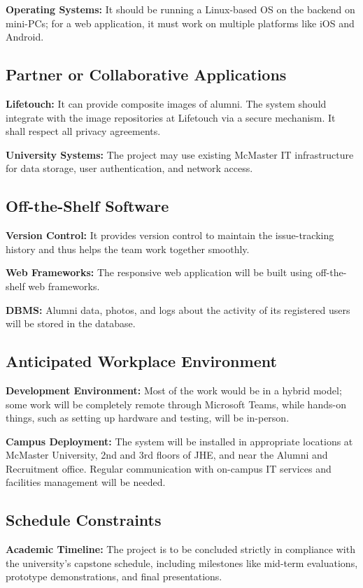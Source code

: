 \documentclass[12pt]{article}
\begin{document}
\textbf{Operating Systems:} It should be running a Linux-based OS on the backend on mini-PCs; for a web application, it must work on multiple platforms like iOS and Android.

\subsection{Partner or Collaborative Applications}
\textbf{Lifetouch:} It can provide composite images of alumni. The system should integrate with the image repositories at Lifetouch via a secure mechanism. It shall respect all privacy agreements.

\textbf{University Systems:} The project may use existing McMaster IT infrastructure for data storage, user authentication, and network access.

\subsection{Off-the-Shelf Software}
\textbf{Version Control:} It provides version control to maintain the issue-tracking history and thus helps the team work together smoothly.

\textbf{Web Frameworks:} The responsive web application will be built using off-the-shelf web frameworks.

\textbf{DBMS:} Alumni data, photos, and logs about the activity of its registered users will be stored in the database.

\subsection{Anticipated Workplace Environment}
\textbf{Development Environment:} Most of the work would be in a hybrid model; some work will be completely remote through Microsoft Teams, while hands-on things, such as setting up hardware and testing, will be in-person.

\textbf{Campus Deployment:} The system will be installed in appropriate locations at McMaster University, 2nd and 3rd floors of JHE, and near the Alumni and Recruitment office. Regular communication with on-campus IT services and facilities management will be needed.

\subsection{Schedule Constraints}
\textbf{Academic Timeline:} The project is to be concluded strictly in compliance with the university's capstone schedule, including milestones like mid-term evaluations, prototype demonstrations, and final presentations.
\end{document}
